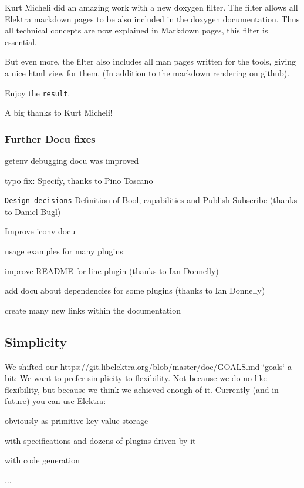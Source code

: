 Kurt Micheli did an amazing work with a new doxygen filter. The filter allows all Elektra markdown pages to be also included in the doxygen documentation. Thus all technical concepts are now explained in Markdown pages, this filter is essential.

But even more, the filter also includes all man pages written for the tools, giving a nice html view for them. (In addition to the markdown rendering on github).

Enjoy the \href{https://doc.libelektra.org/api/0.8.14/html/}{\tt result}.

A big thanks to Kurt Micheli!

\subsubsection*{Further Docu fixes}


\begin{DoxyItemize}
\item getenv debugging docu was improved
\item typo fix\+: Specify, thanks to Pino Toscano
\item \href{https://master.libelektra.org/doc/decisions}{\tt Design decisions} Definition of Bool, capabilities and Publish Subscribe (thanks to Daniel Bugl)
\item Improve iconv docu
\item usage examples for many plugins
\item improve R\+E\+A\+D\+ME for line plugin (thanks to Ian Donnelly)
\item add docu about dependencies for some plugins (thanks to Ian Donnelly)
\item create many new links within the documentation
\end{DoxyItemize}

\subsection*{Simplicity}

We shifted our https\+://git.libelektra.\+org/blob/master/doc/\+G\+O\+A\+LS.md \char`\"{}goals\char`\"{} a bit\+: We want to prefer simplicity to flexibility. Not because we do no like flexibility, but because we think we achieved enough of it. Currently (and in future) you can use Elektra\+:


\begin{DoxyItemize}
\item obviously as primitive key-\/value storage
\item with specifications and dozens of plugins driven by it
\item with code generation
\item ...
\end{DoxyItemize}

